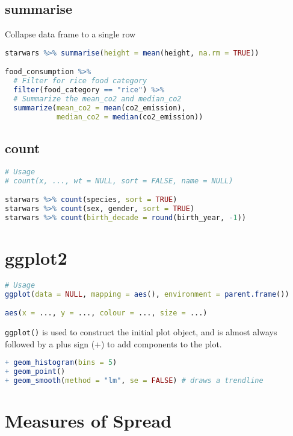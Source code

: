 \documentclass[11pt]{article}
\begin{document}
\subsection{summarise}

Collapse data frame to a single row

\begin{lstlisting}[language=R]
starwars %>% summarise(height = mean(height, na.rm = TRUE))

food_consumption %>%
  # Filter for rice food category
  filter(food_category == "rice") %>%
  # Summarize the mean_co2 and median_co2
  summarize(mean_co2 = mean(co2_emission),
            median_co2 = median(co2_emission))
\end{lstlisting}

\subsection{count}

\begin{lstlisting}[language=R]
# Usage
# count(x, ..., wt = NULL, sort = FALSE, name = NULL)

starwars %>% count(species, sort = TRUE)
starwars %>% count(sex, gender, sort = TRUE)
starwars %>% count(birth_decade = round(birth_year, -1))
\end{lstlisting}

\newpage
\section{ggplot2}
\begin{lstlisting}[language=R]
# Usage
ggplot(data = NULL, mapping = aes(), environment = parent.frame())

aes(x = ..., y = ..., colour = ..., size = ...)
\end{lstlisting}

\lstinline|ggplot()| is used to construct the initial plot object, and is almost always followed by a plus sign (+) to add components to the plot.

\begin{lstlisting}[language=R]
+ geom_histogram(bins = 5)
+ geom_point()
+ geom_smooth(method = "lm", se = FALSE) # draws a trendline
\end{lstlisting}

\newpage
\section{Measures of Spread}
\end{document}
